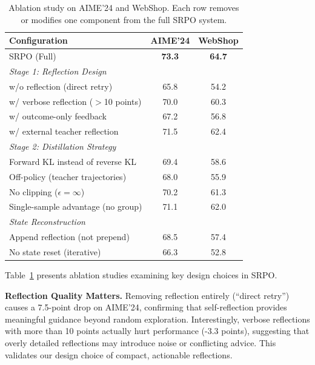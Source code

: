 \documentclass{article}
\newcommand{\method}{SRPO}
\theoremstyle{plain}
\theoremstyle{definition}
\theoremstyle{remark}
\begin{document}
\begin{table}[t]
\centering
\caption{Ablation study on AIME'24 and WebShop. Each row removes or modifies one component from the full \method{} system.}
\label{tab:ablation}
\vspace{0.5em}
\small
\begin{tabular}{@{}lcc@{}}
\toprule
\textbf{Configuration} & \textbf{AIME'24} & \textbf{WebShop} \\
\midrule
\method{} (Full) & \textbf{73.3} & \textbf{64.7} \\
\midrule
\multicolumn{3}{l}{\textit{Stage 1: Reflection Design}} \\
\quad w/o reflection (direct retry) & 65.8 & 54.2 \\
\quad w/ verbose reflection ($>$10 points) & 70.0 & 60.3 \\
\quad w/ outcome-only feedback & 67.2 & 56.8 \\
\quad w/ external teacher reflection & 71.5 & 62.4 \\
\midrule
\multicolumn{3}{l}{\textit{Stage 2: Distillation Strategy}} \\
\quad Forward KL instead of reverse KL & 69.4 & 58.6 \\
\quad Off-policy (teacher trajectories) & 68.0 & 55.9 \\
\quad No clipping ($\epsilon=\infty$) & 70.2 & 61.3 \\
\quad Single-sample advantage (no group) & 71.1 & 62.0 \\
\midrule
\multicolumn{3}{l}{\textit{State Reconstruction}} \\
\quad Append reflection (not prepend) & 68.5 & 57.4 \\
\quad No state reset (iterative) & 66.3 & 52.8 \\
\bottomrule
\end{tabular}
\end{table}

Table~\ref{tab:ablation} presents ablation studies examining key design choices in \method{}.

\textbf{Reflection Quality Matters.}
Removing reflection entirely (``direct retry'') causes a 7.5-point drop on AIME'24, confirming that self-reflection provides meaningful guidance beyond random exploration.
Interestingly, verbose reflections with more than 10 points actually hurt performance (-3.3 points), suggesting that overly detailed reflections may introduce noise or conflicting advice.
This validates our design choice of compact, actionable reflections.
\end{document}
